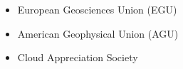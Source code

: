 \documentclass[10pt,a4paper,svgnames]{article}
\begin{document}
\begin{itemize}
\item European Geosciences Union (EGU)
\item American Geophysical Union (AGU)
\item Cloud Appreciation Society
\end{itemize}

%
%
\end{document}
